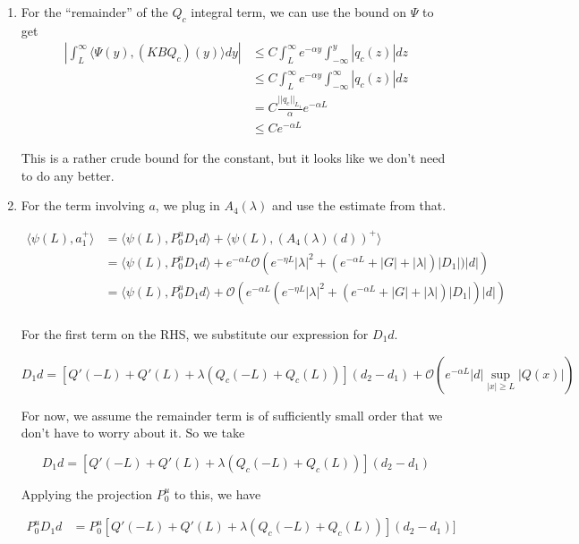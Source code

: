 \documentclass[12pt]{article}
\begin{document}
\begin{enumerate}

\item For the ``remainder'' of the $Q_c$ integral term, we can use the bound on $\Psi$ to get 
\begin{align*}
\left| \int_L^\infty \langle \Psi(y), (K B Q_c)(y) \rangle dy \right| &\leq C \int_L^\infty e^{-\alpha y} \int_{-\infty}^y |q_c(z)| dz\\
&\leq C \int_L^\infty e^{-\alpha y} \int_{-\infty}^\infty |q_c(z)| dz\\
&= C \frac{||q_c||_{L_1}}{\alpha}e^{-\alpha L} \\
&\leq C e^{-\alpha L} 
\end{align*}

This is a rather crude bound for the constant, but it looks like we don't need to do any better.

\item For the term involving $a$, we plug in $A_4(\lambda)$ and use the estimate from that. 

\begin{align*}
\langle \psi(L), a_1^+ \rangle &= \langle \psi(L), P_0^u D_1 d \rangle + \langle \psi(L), (A_4(\lambda)(d))^+\rangle\\
&= \langle \psi(L), P_0^u D_1 d \rangle + e^{-\alpha L} \mathcal{O} \left( e^{-\eta L}|\lambda|^2 + (e^{-\alpha L} + |G| + |\lambda|)|D_1|)|d| \right)\\
&= \langle \psi(L), P_0^u D_1 d \rangle + \mathcal{O} \left( e^{-\alpha L} (e^{-\eta L}|\lambda|^2 + (e^{-\alpha L} + |G| + |\lambda|)|D_1|)|d| \right)\\
\end{align*}

For the first term on the RHS, we substitute our expression for $D_1 d$.

\[
D_1 d = [Q'(-L) + Q'(L) + \lambda(Q_c(-L) + Q_c(L))](d_2 - d_1) + \mathcal{O}\left(e^{-\alpha L} |d| \sup_{|x| \geq L} |Q(x)| \right)
\]

For now, we assume the remainder term is of sufficiently small order that we don't have to worry about it. So we take

\[
D_1 d = [Q'(-L) + Q'(L) + \lambda(Q_c(-L) + Q_c(L))](d_2 - d_1)
\]

Applying the projection $P_0^u$ to this, we have

\begin{align*}
P_0^u D_1 d &= P_0^u [Q'(-L) + Q'(L) + \lambda(Q_c(-L) + Q_c(L))](d_2 - d_1)]
\end{align*}


\end{enumerate}
\end{document}
